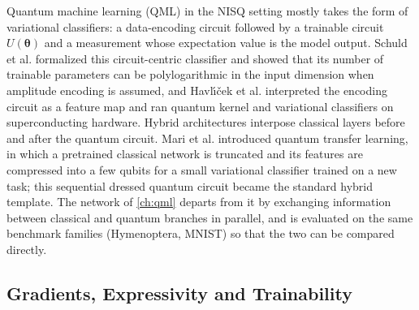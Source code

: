 Quantum machine learning (QML) \cite{biamonte2017qml} in the NISQ setting mostly takes the form of variational classifiers: a data-encoding circuit followed by a trainable circuit $U(\bm{\theta})$ and a measurement whose expectation value is the model output. Schuld et al. \cite{schuld2020circuitcentric} formalized this circuit-centric classifier and showed that its number of trainable parameters can be polylogarithmic in the input dimension when amplitude encoding is assumed, and Havl{\'\i}{\v{c}}ek et al. \cite{havlicek2019featurespaces} interpreted the encoding circuit as a feature map and ran quantum kernel and variational classifiers on superconducting hardware. Hybrid architectures interpose classical layers before and after the quantum circuit. Mari et al. \cite{mari2020transferlearning} introduced quantum transfer learning, in which a pretrained classical network is truncated and its features are compressed into a few qubits for a small variational classifier trained on a new task; this sequential dressed quantum circuit became the standard hybrid template. The \qpie{} network of \cref{ch:qml} \cite{guo2025qpie} departs from it by exchanging information between classical and quantum branches in parallel, and is evaluated on the same benchmark families (Hymenoptera, MNIST) so that the two can be compared directly.

\subsection{Gradients, Expressivity and Trainability}

